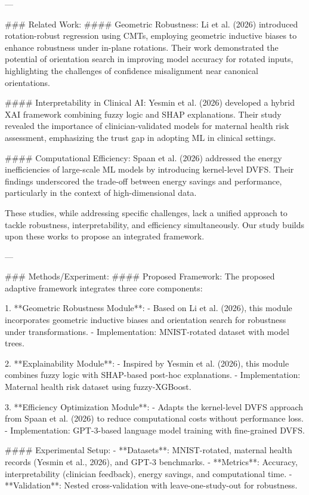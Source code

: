 ---

### Related Work:
#### Geometric Robustness:
Li et al. (2026) introduced rotation-robust regression using CMTs, employing geometric inductive biases to enhance robustness under in-plane rotations. Their work demonstrated the potential of orientation search in improving model accuracy for rotated inputs, highlighting the challenges of confidence misalignment near canonical orientations.

#### Interpretability in Clinical AI:
Yesmin et al. (2026) developed a hybrid XAI framework combining fuzzy logic and SHAP explanations. Their study revealed the importance of clinician-validated models for maternal health risk assessment, emphasizing the trust gap in adopting ML in clinical settings.

#### Computational Efficiency:
Spaan et al. (2026) addressed the energy inefficiencies of large-scale ML models by introducing kernel-level DVFS. Their findings underscored the trade-off between energy savings and performance, particularly in the context of high-dimensional data.

These studies, while addressing specific challenges, lack a unified approach to tackle robustness, interpretability, and efficiency simultaneously. Our study builds upon these works to propose an integrated framework.

---

### Methods/Experiment:
#### Proposed Framework:
The proposed adaptive framework integrates three core components:

1. **Geometric Robustness Module**:
   - Based on Li et al. (2026), this module incorporates geometric inductive biases and orientation search for robustness under transformations.
   - Implementation: MNIST-rotated dataset with model trees.

2. **Explainability Module**:
   - Inspired by Yesmin et al. (2026), this module combines fuzzy logic with SHAP-based post-hoc explanations.
   - Implementation: Maternal health risk dataset using fuzzy-XGBoost.

3. **Efficiency Optimization Module**:
   - Adapts the kernel-level DVFS approach from Spaan et al. (2026) to reduce computational costs without performance loss.
   - Implementation: GPT-3-based language model training with fine-grained DVFS.

#### Experimental Setup:
- **Datasets**: MNIST-rotated, maternal health records (Yesmin et al., 2026), and GPT-3 benchmarks.
- **Metrics**: Accuracy, interpretability (clinician feedback), energy savings, and computational time.
- **Validation**: Nested cross-validation with leave-one-study-out for robustness.

